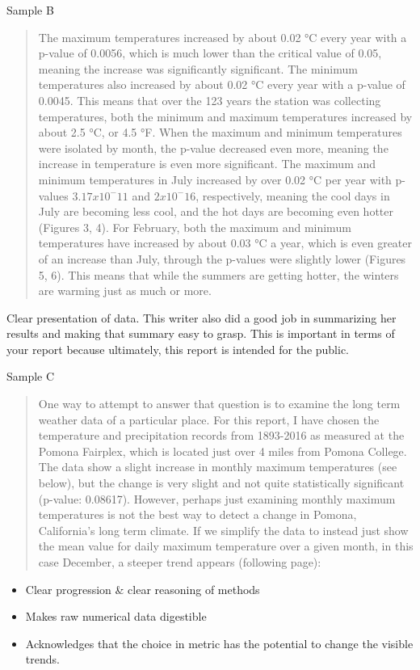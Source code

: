 \documentclass{article}\usepackage[]{graphicx}\usepackage[]{color}
\begin{document}
Sample B
\begin{quote}
The maximum temperatures increased by about 0.02 °C every year with a p-value of 0.0056, which is much lower than the critical value of 0.05, meaning the increase was significantly significant. The minimum temperatures also increased by about 0.02 °C every year with a p-value of 0.0045. This means that over the 123 years the station was collecting temperatures, both the minimum and maximum temperatures increased by about 2.5 °C, or 4.5 °F. When the maximum and minimum temperatures were isolated by month, the p-value decreased even more, meaning the increase in temperature is even more significant. The maximum and minimum temperatures in July increased by over 0.02 °C per year with p-values $3.17 x10^-11$ and $2 x 10^-16$, respectively, meaning the cool days in July are becoming less cool, and the hot days are becoming even hotter (Figures 3, 4). For February, both the maximum and minimum temperatures have increased by about 0.03 °C a year, which is even greater of an increase than July, through the p-values were slightly lower (Figures 5, 6). This means that while the summers are getting hotter, the winters are warming just as much or more.
\end{quote}
Clear presentation of data. This writer also did a good job in summarizing her results and making that summary easy to grasp. This is important in terms of your report because ultimately, this report is intended for the public. 

Sample C
\begin{quote}
One way to attempt to answer that question is to examine the long term weather data of a particular place. For this report, I have chosen the temperature and precipitation records from 1893-2016 as measured at the Pomona Fairplex, which is located just over 4 miles from Pomona College. The data show a slight increase in monthly maximum temperatures (see below), but the change is very slight and not quite statistically significant (p-value: 0.08617). However, perhaps just examining monthly maximum temperatures is not the best way to detect a change in Pomona, California’s long term climate. If we simplify the data to instead just show the mean value for daily maximum temperature over a given month, in this case December, a steeper trend appears (following page):
\end{quote}
\begin{itemize}
  \item Clear progression \& clear reasoning of methods
  \item Makes raw numerical data digestible
  \item Acknowledges that the choice in metric has the potential to change the visible trends. 
\end{itemize}
\end{document}
